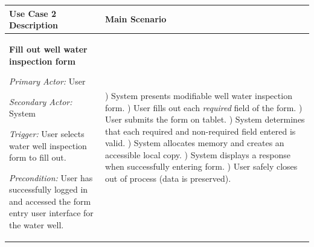 \documentclass[twoside,letterpaper]{article}
\begin{document}
\begin{flushleft}
\tablehead{}
\begin{supertabular}{|m{3.17056in}|m{3.5in}|}
\hline


\bfseries\color{black} Use Case 2 Description &
Main Scenario
\\\hline
{\bfseries\color{black} Fill out well water inspection form}

{\color{black} \textit{Primary Actor:} User}

{\color{black} \textit{Secondary Actor:} System}

{\color{black} \textit{Trigger:} User selects water well inspection form to fill out.}

{\color{black} \textit{Precondition:} User has successfully logged in and accessed the form entry user interface for the water well.}
~
 &
) System presents modifiable well water inspection form.
) User fills out each \textit{required} field of the form.
) User submits the form on tablet.
) System determines that each required and non-required field entered is valid.
) System allocates memory and creates an accessible local copy.
) System displays a response when successfully entering form.
) User safely closes out of process (data is preserved).

\\\hline
\end{supertabular}
\end{flushleft}
\end{document}
